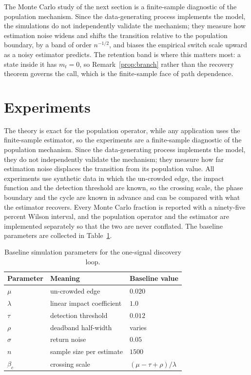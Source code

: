 \documentclass[11pt]{article}
\theoremstyle{plain}
\theoremstyle{definition}
\begin{document}
The Monte Carlo study of the next section is a finite-sample diagnostic of the population mechanism. Since the data-generating process implements the model, the simulations do not independently validate the mechanism; they measure how estimation noise widens and shifts the transition relative to the population boundary, by a band of order $n^{-1/2}$, and biases the empirical switch scale upward as a noisy estimator predicts. The retention band is where this matters most: a state inside it has $m_t=0$, so Remark~\ref{prop:branch} rather than the recovery theorem governs the call, which is the finite-sample face of path dependence.

\section{Experiments}\label{sec:experiments}

The theory is exact for the population operator, while any application uses the finite-sample estimator, so the experiments are a finite-sample diagnostic of the population mechanism. Since the data-generating process implements the model, they do not independently validate the mechanism; they measure how far estimation noise displaces the transition from its population value. All experiments use synthetic data in which the un-crowded edge, the impact function and the detection threshold are known, so the crossing scale, the phase boundary and the cycle are known in advance and can be compared with what the estimator recovers. Every Monte Carlo fraction is reported with a ninety-five percent Wilson interval, and the population operator and the estimator are implemented separately so that the two are never conflated. The baseline parameters are collected in Table~\ref{tab:params}.

\begin{table}[h]
\centering
\begin{tabular}{lll}
\toprule
Parameter & Meaning & Baseline value \\
\midrule
$\mu$ & un-crowded edge & $0.020$ \\
$\lambda$ & linear impact coefficient & $1.0$ \\
$\tau$ & detection threshold & $0.012$ \\
$\rho$ & deadband half-width & varies \\
$\sigma$ & return noise & $0.05$ \\
$n$ & sample size per estimate & $1500$ \\
$\beta_c$ & crossing scale & $(\mu-\tau+\rho)/\lambda$ \\
\bottomrule
\end{tabular}
\caption{Baseline simulation parameters for the one-signal discovery loop.}
\label{tab:params}
\end{table}
\end{document}
